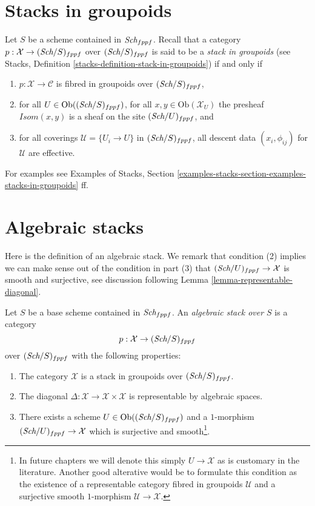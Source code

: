 \section{Stacks in groupoids}
\label{section-stacks}

\noindent
Let $S$ be a scheme contained in $\textit{Sch}_{fppf}$.
Recall that a category $p : \mathcal{X} \to (\textit{Sch}/S)_{fppf}$
over $(\textit{Sch}/S)_{fppf}$ is said to be a
{\it stack in groupoids} (see
Stacks, Definition \ref{stacks-definition-stack-in-groupoids})
if and only if
\begin{enumerate}
\item $p : \mathcal{X} \to \mathcal{C}$ is fibred
in groupoids over $(\textit{Sch}/S)_{fppf}$,
\item for all $U \in \text{Ob}((\textit{Sch}/S)_{fppf})$,
for all $x, y\in \text{Ob}(\mathcal{X}_U)$ the presheaf
$\mathit{Isom}(x, y)$ is a sheaf on the site $(\textit{Sch}/U)_{fppf}$, and
\item for all coverings $\mathcal{U} = \{U_i \to U\}$ in
$(\textit{Sch}/S)_{fppf}$, all descent data $(x_i, \phi_{ij})$
for $\mathcal{U}$ are effective.
\end{enumerate}
For examples see
Examples of Stacks,
Section \ref{examples-stacks-section-examples-stacks-in-groupoids}
ff.










\section{Algebraic stacks}
\label{section-algebraic-stacks}

\noindent
Here is the definition of an algebraic stack. We remark that condition
(2) implies we can make sense out of the condition in part (3) that
$(\textit{Sch}/U)_{fppf} \to \mathcal{X}$
is smooth and surjective, see discussion following
Lemma \ref{lemma-representable-diagonal}.

\begin{definition}
\label{definition-algebraic-stack}
Let $S$ be a base scheme contained in $\textit{Sch}_{fppf}$.
An {\it algebraic stack over $S$} is a category
$$
p : \mathcal{X} \to (\textit{Sch}/S)_{fppf}
$$
over $(\textit{Sch}/S)_{fppf}$ with the following properties:
\begin{enumerate}
\item The category $\mathcal{X}$ is a stack in groupoids over
$(\textit{Sch}/S)_{fppf}$.
\item The diagonal
$\Delta : \mathcal{X} \to \mathcal{X}\times\mathcal{X}$
is representable by algebraic spaces.
\item There exists a scheme $U \in \text{Ob}((\textit{Sch}/S)_{fppf})$
and a $1$-morphism $(\textit{Sch}/U)_{fppf} \to \mathcal{X}$
which is surjective and smooth\footnote{In future chapters we will denote
this simply $U \to \mathcal{X}$ as is customary in the literature. Another
good alterative would be to formulate this condition as the existence of a
representable category fibred in groupoids $\mathcal{U}$ and a surjective
smooth $1$-morphism $\mathcal{U} \to \mathcal{X}$.}.
\end{enumerate}
\end{definition}

